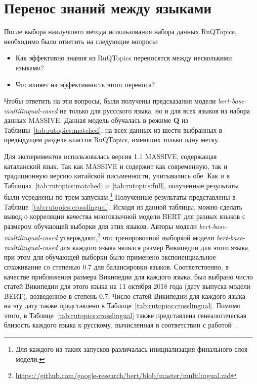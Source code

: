 \section{Перенос знаний между языками}
После выбора наилучшего метода использования набора данных {RuQTopics}, необходимо было ответить на следующие вопросы:
\begin{itemize}
\item Как эффективно знания из {RuQTopics} переносятся между несколькими языками?
\item Что влияет на эффективность этого переноса?
\end{itemize}
Чтобы ответить на эти вопросы, были получены предсказания модели \textit{bert-base-multilingual-cased} не только для руссского языка, но и для всех языков из набора данных {MASSIVE}. Данная модель обучалась в режиме \textbf{Q} из Таблицы~\ref{tab:rutopics:matched}, на всех данных из шести выбранных в предыдущем разделе классов {RuQTopics}, имеющих только одну метку.

Для экспериментов использовалась версия 1.1 {MASSIVE}, содержащая каталанский язык. Так как {MASSIVE} и содержит как современную, так и традиционную версию китайской письменности, учитывались обе. Как и в Таблицах~\ref{tab:rutopics:matched} и~\ref{tab:rutopics:full}, полученные результаты были усреднены по трем запускам.\footnote{Для каждого из таких запусков различалась инициализация финального слоя модели.}
Полученные результаты представлены в Таблице~\ref{tab:rutopics:crosslingual}. Исходя из данной таблицы, можно сделать вывод о корреляции качества многоязычной модели BERT для разных языков с размером обучающей выборки для этих языков. Авторы модели \textit{bert-base-multilingual-cased} утверждают,\footnote{\url{https://github.com/google-research/bert/blob/master/multilingual.md}} что тренировочной выборкой модели \textit{bert-base-multilingual-cased} для каждого языка являлся размер Википедии для этого языка, при этом для обучающей выборки было применено экспоненциальное сглаживание со степенью 0.7 для балансировки языков.
Соответственно, в качестве приближения размера Википедии для каждого языка, был выбрано число статей Википедии для этого языка на 11 октября 2018 года (дату выпуска модели BERT), возведенное в степень 0.7.  Число статей Википедии для каждого языка на эту дату также представлено в Таблице~\ref{tab:rutopics:crosslingual}. Помимо этого, в Таблице~\ref{tab:rutopics:crosslingual} также представлена генеалогическая близость каждого языка к русскому, вычисленная в соответствии с работой~\cite{lang_sim}.

